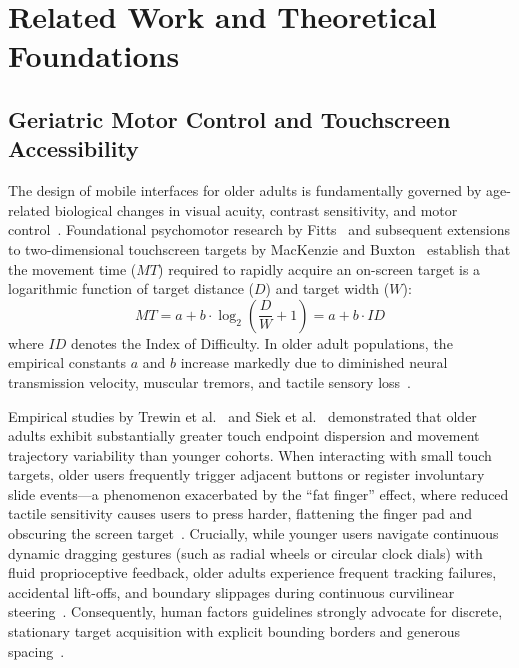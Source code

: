 \documentclass[11pt,a4paper]{article}
\begin{document}
\section{Related Work and Theoretical Foundations}
\label{sec:related_work}

\subsection{Geriatric Motor Control and Touchscreen Accessibility}

The design of mobile interfaces for older adults is fundamentally governed by age-related biological changes in visual acuity, contrast sensitivity, and motor control~\cite{fisk2009designing,stronge2007human}. Foundational psychomotor research by Fitts~\cite{fitts1954information} and subsequent extensions to two-dimensional touchscreen targets by MacKenzie and Buxton~\cite{mackenzie1992extending} establish that the movement time ($MT$) required to rapidly acquire an on-screen target is a logarithmic function of target distance ($D$) and target width ($W$):
\begin{equation}
    MT = a + b \cdot \log_2\left(\frac{D}{W} + 1\right) = a + b \cdot ID
    \label{eq:fitts}
\end{equation}
where $ID$ denotes the Index of Difficulty. In older adult populations, the empirical constants $a$ and $b$ increase markedly due to diminished neural transmission velocity, muscular tremors, and tactile sensory loss~\cite{trewin2013physical}.

Empirical studies by Trewin et al.~\cite{trewin2013physical} and Siek et al.~\cite{siek2006fat} demonstrated that older adults exhibit substantially greater touch endpoint dispersion and movement trajectory variability than younger cohorts. When interacting with small touch targets, older users frequently trigger adjacent buttons or register involuntary slide events---a phenomenon exacerbated by the ``fat finger'' effect, where reduced tactile sensitivity causes users to press harder, flattening the finger pad and obscuring the screen target~\cite{siek2006fat,piper2010exploring}. Crucially, while younger users navigate continuous dynamic dragging gestures (such as radial wheels or circular clock dials) with fluid proprioceptive feedback, older adults experience frequent tracking failures, accidental lift-offs, and boundary slippages during continuous curvilinear steering~\cite{kurniawan2008older,wildenbos2018aging}. Consequently, human factors guidelines strongly advocate for discrete, stationary target acquisition with explicit bounding borders and generous spacing~\cite{fisk2009designing,w3c2018wcag}.
\end{document}
